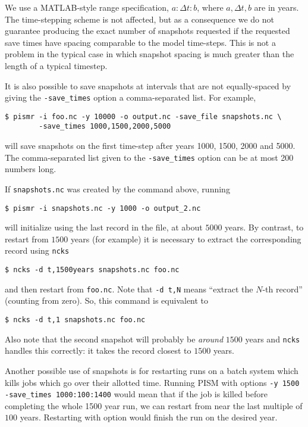 We use a MATLAB-style range specification, $a:\Delta t:b$, where $a,\Delta t,b$ are in years.  The time-stepping scheme is not affected, but as a consequence we do not guarantee producing the exact number of snapshots requested if the requested save times have spacing comparable to the model time-steps.  This is not a problem in the typical case in which snapshot spacing is much greater than the length of a typical timestep.

It is also possible to save snapshots at intervals that are not equally-spaced
by giving the \verb|-save_times| option a comma-separated list. For example,
\begin{verbatim}
$ pismr -i foo.nc -y 10000 -o output.nc -save_file snapshots.nc \
        -save_times 1000,1500,2000,5000
\end{verbatim}
will save snapshots on the first time-step after years 1000, 1500, 2000 and 5000.
The comma-separated list given to the \verb|-save_times| option can be at most 200 numbers long.

If \verb|snapshots.nc| was created by the command above, running
\begin{verbatim}
$ pismr -i snapshots.nc -y 1000 -o output_2.nc
\end{verbatim}
will initialize using the last record in the file, at about $5000$ years.  By contrast, to restart from $1500$ years (for example) it is necessary to extract the corresponding record using \verb|ncks|
\begin{verbatim}
$ ncks -d t,1500years snapshots.nc foo.nc
\end{verbatim}
and then restart from \verb|foo.nc|.  Note that \verb|-d t,N| means ``extract the $N$-th record'' (counting from zero).  So, this command is equivalent to
\begin{verbatim}
$ ncks -d t,1 snapshots.nc foo.nc
\end{verbatim}
Also note that the second snapshot will probably be \emph{around} $1500$ years and \verb|ncks| handles this correctly: it takes the record closest to $1500$ years.

Another possible use of snapshots is for restarting runs on a batch system which kills jobs which go over their allotted time.  Running PISM with options \verb|-y 1500| \verb|-save_times 1000:100:1400| would mean that if the job is killed before completing the whole 1500 year run, we can restart from near the last multiple of $100$ years.  Restarting with option  would finish the run on the desired year.

